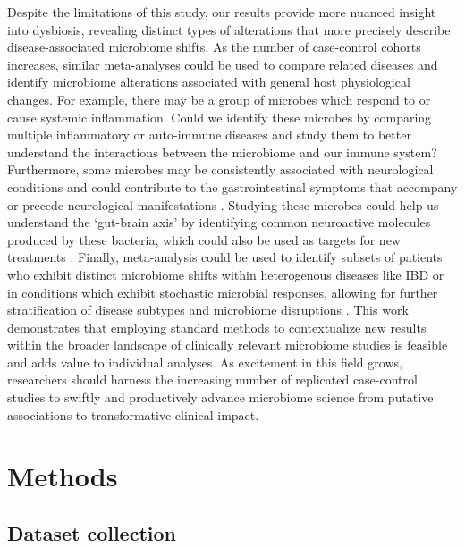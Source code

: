 Despite the limitations of this study, our results provide more nuanced insight into dysbiosis, revealing distinct types of alterations that more precisely describe disease-associated microbiome shifts.
As the number of case-control cohorts increases, similar meta-analyses could be used to compare related diseases and identify microbiome alterations associated with general host physiological changes.
For example, there may be a group of microbes which respond to or cause systemic inflammation.
Could we identify these microbes by comparing multiple inflammatory or auto-immune diseases and study them to better understand the interactions between the microbiome and our immune system?
Furthermore, some microbes may be consistently associated with neurological conditions and could contribute to the gastrointestinal symptoms that accompany or precede neurological manifestations \cite{asd-kb,par-schep}.
Studying these microbes could help us understand the `gut-brain axis' by identifying common neuroactive molecules produced by these bacteria, which could also be used as targets for new treatments \cite{Hsiao2013gutbrain,Cryan2012gutbrain,Poutahidis2013gutbrain}.
Finally, meta-analysis could be used to identify subsets of patients who exhibit distinct microbiome shifts within heterogenous diseases like IBD or in conditions which exhibit stochastic microbial responses, allowing for further stratification of disease subtypes and microbiome disruptions \cite{zaneveld2017karenina,ibd-engstrand,Pascal2017crohns}.
This work demonstrates that employing standard methods to contextualize new results within the broader landscape of clinically relevant microbiome studies is feasible and adds value to individual analyses.
As excitement in this field grows, researchers should harness the increasing number of replicated case-control studies to swiftly and productively advance microbiome science from putative associations to transformative clinical impact.


\section{Methods}

\subsection{Dataset collection}

